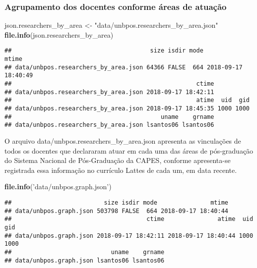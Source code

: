 \documentclass[]{article}
\newenvironment{Shaded}{\begin{snugshade}}{\end{snugshade}}
\newcommand{\KeywordTok}[1]{\textcolor[rgb]{0.13,0.29,0.53}{\textbf{#1}}}
\newcommand{\StringTok}[1]{\textcolor[rgb]{0.31,0.60,0.02}{#1}}
\newcommand{\NormalTok}[1]{#1}
\begin{document}
\subsubsection{Agrupamento dos docentes conforme áreas de
atuação}\label{agrupamento-dos-docentes-conforme-areas-de-atuacao}

\begin{Shaded}
\begin{Highlighting}[]
\NormalTok{json.researchers_by_area <-}\StringTok{ "data/unbpos.researchers_by_area.json"} 
\KeywordTok{file.info}\NormalTok{(json.researchers_by_area)}
\end{Highlighting}
\end{Shaded}

\begin{verbatim}
##                                       size isdir mode               mtime
## data/unbpos.researchers_by_area.json 64366 FALSE  664 2018-09-17 18:40:49
##                                                    ctime
## data/unbpos.researchers_by_area.json 2018-09-17 18:42:11
##                                                    atime  uid  gid
## data/unbpos.researchers_by_area.json 2018-09-17 18:45:35 1000 1000
##                                          uname    grname
## data/unbpos.researchers_by_area.json lsantos06 lsantos06
\end{verbatim}

O arquivo data/unbpos.researchers\_by\_area.json apresenta as
vinculações de todos os docentes que declararam atuar em cada uma das
áreas de pós-graduação do Sistema Nacional de Pós-Graduação da CAPES,
conforme apresenta-se registrada essa informação no currículo Lattes de
cada um, em data recente.

\begin{Shaded}
\begin{Highlighting}[]
\KeywordTok{file.info}\NormalTok{(}\StringTok{'data/unbpos.graph.json'}\NormalTok{)}
\end{Highlighting}
\end{Shaded}

\begin{verbatim}
##                          size isdir mode               mtime
## data/unbpos.graph.json 503798 FALSE  664 2018-09-17 18:40:44
##                                      ctime               atime  uid  gid
## data/unbpos.graph.json 2018-09-17 18:42:11 2018-09-17 18:40:44 1000 1000
##                            uname    grname
## data/unbpos.graph.json lsantos06 lsantos06
\end{verbatim}
\end{document}
